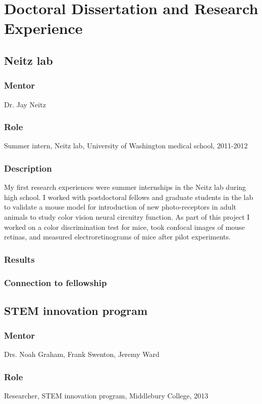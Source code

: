 \documentclass[11pt]{article}
\begin{document}
\section*{Doctoral Dissertation and Research Experience}
%
\subsection{Neitz lab}
\begin{refsection}
\subsubsection{Mentor}
Dr. Jay Neitz
%
\subsubsection{Role}
Summer intern, Neitz lab, University of Washington medical school, 2011-2012
%
\subsubsection{Description}
My first research experiences were summer internships in the Neitz lab during high school. I worked with postdoctoral fellows and graduate students in the lab to validate a mouse model for introduction of new photo-receptors in adult animals to study color vision neural circuitry function. As part of this project I worked on a color discrimination test for mice, took confocal images of mouse retinas, and measured electroretinograms of mice after pilot experiments.
%
\subsubsection{Results}
%
\subsubsection{Connection to fellowship}
%
\nocite{Desmarais2012-ki,Desmarais2012-oz,Desmarais2012-nx}
\printbibliography[heading=none]
\end{refsection}
%
\subsection{STEM innovation program}
\subsubsection{Mentor}
Drs. Noah Graham, Frank Swenton, Jeremy Ward
%
\subsubsection{Role}
Researcher, STEM innovation program, Middlebury College, 2013
%
\end{document}
